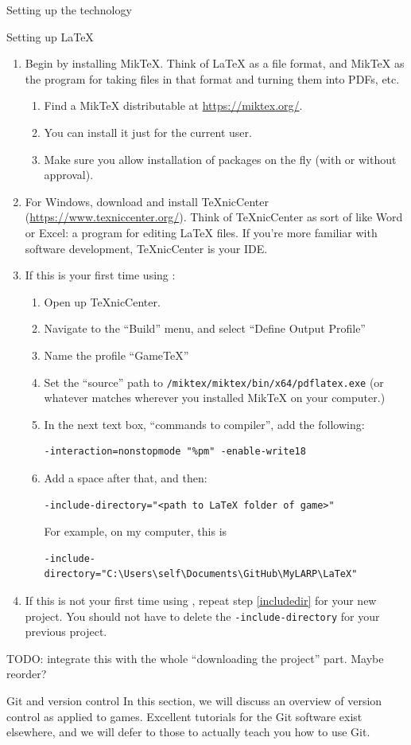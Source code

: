 \documentclass[sheet]{GameTexBase}
\begin{document}
\begin{section}{Setting up the technology}
\begin{subsection}{Setting up \LaTeX{}}
\begin{enumerate}
\item Begin by installing MikTeX.  Think of \LaTeX{} as a file format, and MikTeX as the program for taking files in that format and turning them into PDFs, etc.
\begin{enumerate}
\item Find a MikTeX distributable at \url{https://miktex.org/}.
\item You can install it just for the current user.
\item Make sure you allow installation of packages on the fly (with or without approval).
\end{enumerate}
\item For Windows, download and install TeXnicCenter (\url{https://www.texniccenter.org/}).  Think of TeXnicCenter as sort of like Word or Excel: a program for editing \LaTeX{} files.  If you're more familiar with software development, TeXnicCenter is your IDE.
\item If this is your first time using \gametex{}:
\begin{enumerate}
\item Open up TeXnicCenter.
\item Navigate to the “Build” menu, and select “Define Output Profile”
\item Name the profile “GameTeX”
\item Set the “source” path to \texttt{/miktex/miktex/bin/x64/pdflatex.exe} (or whatever matches wherever you installed MikTeX on your computer.)   
\item In the next text box, “commands to compiler”, add the following:
\begin{verbatim}
-interaction=nonstopmode "%pm" -enable-write18
\end{verbatim}
\item \label{includedir} Add a space after that, and then: 
\begin{verbatim}
-include-directory="<path to LaTeX folder of game>"
\end{verbatim}
For example, on my computer, this is
\begin{verbatim}
-include-directory="C:\Users\self\Documents\GitHub\MyLARP\LaTeX"
\end{verbatim}
\end{enumerate}
\item If this is not your first time using \gametex{}, repeat step \ref{includedir} for your new project.  You should not have to delete the \lstinline|-include-directory| for your previous project.
\end{enumerate}
TODO: integrate this with the whole ``downloading the project'' part.  Maybe reorder?
\end{subsection}
\begin{subsection}{Git and version control}
In this section, we will discuss an overview of version control as applied to games.  Excellent tutorials for the Git software exist elsewhere, and we will defer to those to actually teach you how to use Git.


\end{subsection}
\end{section}
\end{document}
